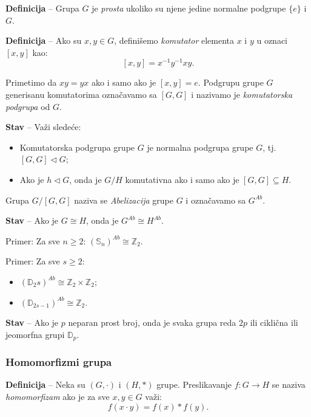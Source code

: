 \documentclass[a4paper,12pt]{article}
\newcommand{\f}[1]{\(#1\)}
\begin{document}
\medskip
\textbf{Definicija} -- Grupa \f{G} je \emph{prosta} ukoliko su njene jedine normalne podgrupe \f{\{e\}} i \f{G}.

\medskip
\textbf{Definicija} -- Ako su \f{x, y \in G}, definišemo \emph{komutator} elementa \f{x} i \f{y} u oznaci \f{[x, y]} kao:
\[
  [x, y] = x^{-1}y^{-1}xy.
\]  

Primetimo da \f{xy = yx} ako i samo ako je \f{[x, y] = e}. Podgrupu grupe \f{G} generisanu
komutatorima označavamo sa \f{[G, G]} i nazivamo je \emph{komutatorska podgrupa} od \f{G}.

\bigskip
\textbf{Stav} -- Važi sledeće:
\begin{itemize}
  \item Komutatorska podgrupa grupe \f{G} je normalna podgrupa grupe \f{G}, tj. \f{[G, G] \triangleleft G};
  \item Ako je \f{h \triangleleft G}, onda je \f{G/H} komutativna ako i samo ako je \f{[G, G] \subseteq H}.
\end{itemize}

\bigskip

Grupa \f{G/[G, G]} naziva se \emph{Abelizacija} grupe \f{G} i označavamo sa \f{G^{Ab}}.

\smallskip
\textbf{Stav} -- Ako je \f{G \cong H}, onda je \f{G^{Ab} \cong H^{Ab}}.

\smallskip

Primer: Za sve \f{n \geq 2}: \f{(\mathbb{S}_n)^{Ab} \cong \mathbb{Z}_2}.

Primer: Za sve \f{s \geq 2}:
\begin{itemize}
  \item \f{(\mathbb{D}_2s)^{Ab} \cong \mathbb{Z}_2 \times \mathbb{Z}_2};
  \item \f{(\mathbb{D}_{2s-1})^{Ab} \cong \mathbb{Z}_2}.
\end{itemize}

\bigskip

\textbf{Stav} -- Ako je \f{p} neparan prost broj, onda je svaka grupa reda \f{2p} ili ciklična ili jeomorfna grupi \f{\mathbb{D}_p}.

\subsubsection{Homomorfizmi grupa}

\textbf{Definicija} --  Neka su \f{(G, \cdot)} i \f{(H, *)} grupe. Preslikavanje \f{f : G \rightarrow H} se naziva \emph{homomorfizam} ako je za sve \f{x, y \in G} važi:
\[
  f(x \cdot y) = f(x) * f(y).
\]
\end{document}
